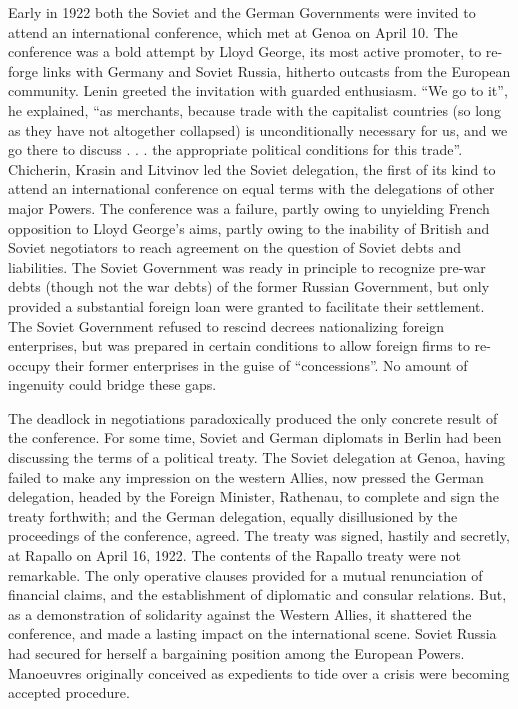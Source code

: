 Early in 1922 both the Soviet and the German Governments were invited to attend an international conference, which met at Genoa on April 10. The conference was a bold attempt by Lloyd George, its most active promoter, to re-forge links with Germany and Soviet Russia, hitherto outcasts from the European community. Lenin greeted the invitation with guarded enthusiasm. ``We go to it'', he explained, ``as merchants, because trade with the capitalist countries (so long as they have not altogether collapsed) is unconditionally necessary for us, and we go there to discuss . . . the appropriate political conditions for this trade''. Chicherin, Krasin and Litvinov led the Soviet delegation, the first of its kind to attend an international conference on equal terms with the delegations of other major Powers. The conference was a failure, partly owing to unyielding French opposition to Lloyd George's aims, partly owing to the inability of British and Soviet negotiators to reach agreement on the question of Soviet debts and liabilities. The Soviet Government was ready in principle to recognize pre-war debts (though not the war debts) of the former Russian Government, but only provided a substantial foreign loan were granted to facilitate their settlement. The Soviet Government refused to rescind decrees nationalizing foreign enterprises, but was prepared in certain conditions to allow foreign firms to re-occupy their former enterprises in the guise of ``concessions''. No amount of ingenuity could bridge these gaps. 

The deadlock in negotiations paradoxically produced the only concrete result of the conference. For some time, Soviet and German diplomats in Berlin had been discussing the terms of a political treaty. The Soviet delegation at Genoa, having failed to make any impression on the western Allies, now pressed the German delegation, headed by the Foreign Minister, Rathenau, to complete and sign the treaty forthwith; and the German delegation, equally disillusioned by the proceedings of the conference, agreed. The treaty was signed, hastily and secretly, at Rapallo on April 16, 1922. The contents of the Rapallo treaty were not remarkable. The only operative clauses provided for a mutual renunciation of financial claims, and the establishment of diplomatic and consular relations. But, as a demonstration of solidarity against the Western Allies, it shattered the conference, and made a lasting impact on the international scene. Soviet Russia had secured for herself a bargaining position among the European Powers. Manoeuvres originally conceived as expedients to tide over a crisis were becoming accepted procedure. 

